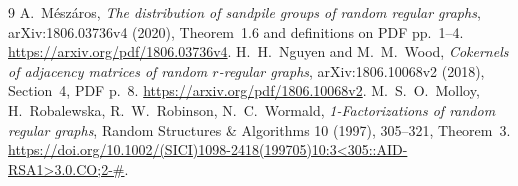 \documentclass[11pt]{article}
\begin{document}
\begin{thebibliography}{9}
 A.~M\'esz\'aros,
\emph{The distribution of sandpile groups of random regular graphs},
arXiv:1806.03736v4 (2020), Theorem~1.6 and definitions on PDF pp.~1--4.
\url{https://arxiv.org/pdf/1806.03736v4}.
 H.~H.~Nguyen and M.~M.~Wood,
\emph{Cokernels of adjacency matrices of random $r$-regular graphs},
arXiv:1806.10068v2 (2018), Section~4, PDF p.~8.
\url{https://arxiv.org/pdf/1806.10068v2}.
 M.~S.~O.~Molloy, H.~Robalewska, R.~W.~Robinson,
N.~C.~Wormald, \emph{1-Factorizations of random regular graphs},
Random Structures \& Algorithms 10 (1997), 305--321, Theorem~3.
\url{https://doi.org/10.1002/(SICI)1098-2418(199705)10:3<305::AID-RSA1>3.0.CO;2-\#}.
\end{thebibliography}
\end{document}
